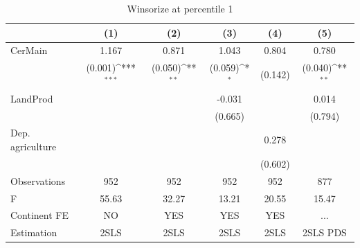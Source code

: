 \documentclass[12pt,a4paper]{article}
\begin{document}
\begin{table}[htbp]\centering
\def\sym#1{\ifmmode^{#1}\else\(^{#1}\)\fi}
\caption{Winsorize at percentile 1}
\begin{tabular}{l*{5}{c}}
\hline\hline
                &\multicolumn{1}{c}{(1)}         &\multicolumn{1}{c}{(2)}         &\multicolumn{1}{c}{(3)}         &\multicolumn{1}{c}{(4)}         &\multicolumn{1}{c}{(5)}         \\
\hline
CerMain         &    1.167         &    0.871         &    1.043         &    0.804         &    0.780         \\
                &  (0.001)\sym{***}&  (0.050)\sym{**} &  (0.059)\sym{*}  &  (0.142)         &  (0.040)\sym{**} \\
LandProd        &                  &                  &   -0.031         &                  &    0.014         \\
                &                  &                  &  (0.665)         &                  &  (0.794)         \\
Dep. agriculture&                  &                  &                  &    0.278         &                  \\
                &                  &                  &                  &  (0.602)         &                  \\
\hline
Observations    &      952         &      952         &      952         &      952         &      877         \\
F               &    55.63         &    32.27         &    13.21         &    20.55         &    15.47         \\
Continent FE    &       NO         &      YES         &      YES         &      YES         &      ...         \\
Estimation      &     2SLS         &     2SLS         &     2SLS         &     2SLS         & 2SLS PDS         \\
\hline\hline
\end{tabular}
\end{table}
\end{document}
